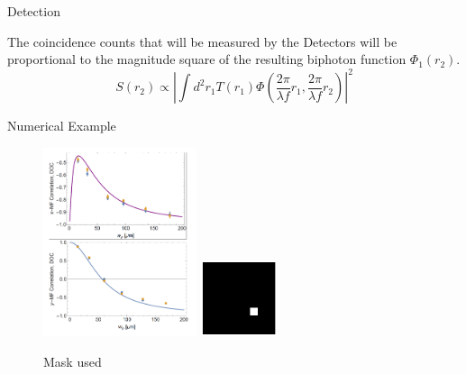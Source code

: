 \documentclass[xcolor=dvipsnames]{beamer}
\begin{document}
\begin{frame}{Detection}

\item The coincidence counts that will be measured by the Detectors will be proportional to the magnitude square of the resulting biphoton function $\Phi_1 (r_2)$.
\begin{equation}
S(r_2) \propto |  \int d^2 r_1 T(r_1) \Phi (\frac{2 \pi}{\lambda f}r_1, \frac{2 \pi}{\lambda f}r_2) |^2
\end{equation}
\end{frame}
\begin{frame}{Numerical Example}
\begin{figure}

{  \includegraphics[width=0.4\textwidth]{pictures/correlationGraph.png} }
{  \includegraphics[width=0.2\textwidth]{pictures/mask.png} }
\caption{Mask used}
 \label{n1}
 
\end{figure}

\end{frame}
\end{document}
